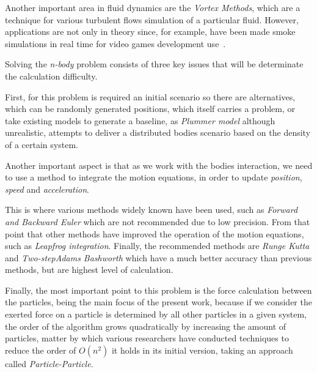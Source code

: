 Another important area in fluid dynamics are the \emph{Vortex Methods},
which are a technique for various turbulent flows simulation of a particular fluid.
However, applications are not only in theory since, for example,
have been made smoke simulations in real time for video games development use~\cite{Gourlay}.


Solving the \emph{n-body} problem consists of three
key issues that will be determinate the calculation difficulty.

First, for this problem is required an initial scenario
so there are alternatives, which can be
randomly generated positions, which itself carries a problem,
or take existing models to generate a baseline,
as \emph{Plummer model} although unrealistic,
attempts to deliver a distributed bodies scenario
based on the density of a certain system.

Another important aspect is that as we work with the bodies interaction,
we need to use a method to integrate the motion equations,
in order to update \emph{position}, \emph{speed}
and \emph{acceleration}.

This is where various methods widely known have been used,
such as \emph{Forward and Backward Euler} which are not recommended
due to low precision. From that point that other methods have improved
the operation of the motion equations, such as \emph{Leapfrog integration}.
Finally, the recommended methods are \emph{Runge Kutta} and \emph{Two-stepAdams Bashworth}
which have a much better accuracy than previous methods, but are
highest level of calculation.

Finally, the most important point to this problem is the force calculation between the particles,
being the main focus of the present work, because if we consider the exerted force on a particle
is determined by all other particles in a given system, the order of the algorithm grows
quadratically by increasing the amount of particles, matter by which various researchers have
conducted techniques to reduce the order of $O(n^2)$ it holds in its initial version,
taking an approach called \emph{Particle-Particle}.







